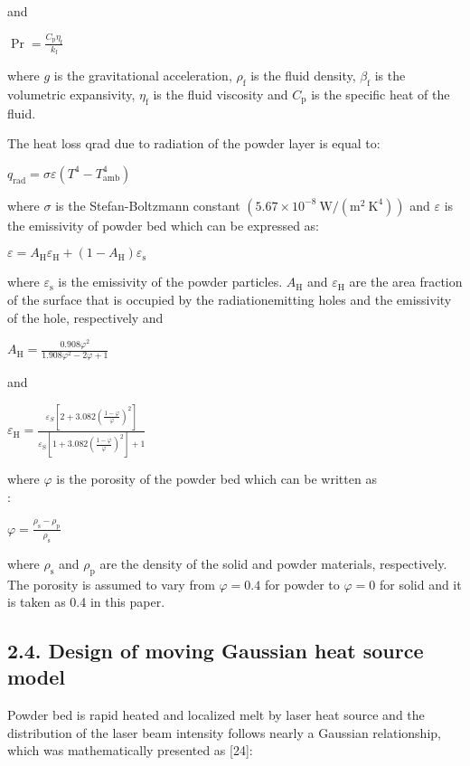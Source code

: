 \documentclass[10pt]{article}
\begin{document}
and

$\operatorname{Pr}=\frac{C_{\mathrm{p}} \eta_{\mathrm{f}}}{k_{\mathrm{f}}}$

where $g$ is the gravitational acceleration, $\rho_{\mathrm{f}}$ is the fluid density, $\beta_{\mathrm{f}}$ is the volumetric expansivity, $\eta_{\mathrm{f}}$ is the fluid viscosity and $C_{\mathrm{p}}$ is the specific heat of the fluid.

The heat loss qrad due to radiation of the powder layer is equal to:

$q_{\mathrm{rad}}=\sigma \varepsilon\left(T^{4}-T_{\mathrm{amb}}^{4}\right)$

where $\sigma$ is the Stefan-Boltzmann constant $\left(5.67 \times 10^{-8} \mathrm{~W} /\left(\mathrm{m}^{2} \mathrm{~K}^{4}\right)\right)$ and $\varepsilon$ is the emissivity of powder bed which can be expressed as:

$\varepsilon=A_{\mathrm{H}} \varepsilon_{\mathrm{H}}+\left(1-A_{\mathrm{H}}\right) \varepsilon_{\mathrm{s}}$

where $\varepsilon_{\mathrm{s}}$ is the emissivity of the powder particles. $A_{\mathrm{H}}$ and $\varepsilon_{\mathrm{H}}$ are the area fraction of the surface that is occupied by the radiationemitting holes and the emissivity of the hole, respectively and

$A_{\mathrm{H}}=\frac{0.908 \varphi^{2}}{1.908 \varphi^{2}-2 \varphi+1}$

and

$\varepsilon_{\mathrm{H}}=\frac{\varepsilon_{S}\left[2+3.082\left(\frac{1-\varphi}{\varphi}\right)^{2}\right]}{\varepsilon_{\mathrm{S}}\left[1+3.082\left(\frac{1-\varphi}{\varphi}\right)^{2}\right]+1}$

where $\varphi$ is the porosity of the powder bed which can be written as\\
[20]:

$\varphi=\frac{\rho_{\mathrm{s}}-\rho_{\mathrm{p}}}{\rho_{\mathrm{s}}}$

where $\rho_{\mathrm{s}}$ and $\rho_{\mathrm{p}}$ are the density of the solid and powder materials, respectively. The porosity is assumed to vary from $\varphi=0.4$ for powder to $\varphi=0$ for solid and it is taken as 0.4 in this paper.

\subsection*{2.4. Design of moving Gaussian heat source model}
Powder bed is rapid heated and localized melt by laser heat source and the distribution of the laser beam intensity follows nearly a Gaussian relationship, which was mathematically presented as [24]:
\end{document}
